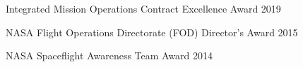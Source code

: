 Integrated Mission Operations Contract Excellence Award \hfill 2019

NASA Flight Operations Directorate (FOD) Director's Award \hfill 2015

NASA Spaceflight Awareness Team Award \hfill 2014